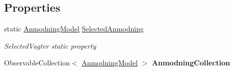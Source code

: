 \subsection*{Properties}
\begin{DoxyCompactItemize}
\item 
static \hyperlink{class__1aarsproeve_1_1_model_1_1_anmodning_model}{Anmodning\+Model} \hyperlink{class__1aarsproeve_1_1_view_model_1_1_hoved_view_model_ab4a4d861215f4d6f8d5ca53382d88d8d}{Selected\+Anmodning}
\begin{DoxyCompactList}\small\item\em Selected\+Vagter static property \end{DoxyCompactList}\item 
\hypertarget{class__1aarsproeve_1_1_view_model_1_1_hoved_view_model_a36a44e96dd4fe24af2130c2fac90f1b0}{}Observable\+Collection$<$ \hyperlink{class__1aarsproeve_1_1_model_1_1_anmodning_model}{Anmodning\+Model} $>$ {\bfseries Anmodning\+Collection}\label{class__1aarsproeve_1_1_view_model_1_1_hoved_view_model_a36a44e96dd4fe24af2130c2fac90f1b0}


\end{DoxyCompactItemize}
